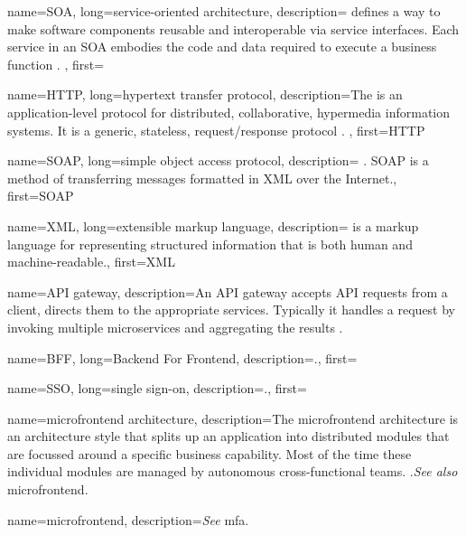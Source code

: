{
    name=SOA, 
    long={service-oriented architecture},
    description={
     defines a way to make software components reusable and
    interoperable via service interfaces. Each service in an SOA embodies the
    code and data required to execute a business function \autocite{IBM_2021}.
    },
    first=
}

{
    name=HTTP,
    long={hypertext transfer protocol},
    description={The  is an application-level
    protocol for distributed, collaborative, hypermedia information
    systems. It is a generic, stateless, request/response protocol
    \autocite{Fielding_etal_1999}.
    },
    first=HTTP %
}

{
    name=SOAP, 
    long={simple object access protocol},
    description={
    . SOAP is a method of transferring messages formatted in
    XML over the Internet.},
    first=SOAP
}

{
    name=XML,
    long={extensible markup language},
    description={ is a markup language for representing
    structured information that is both human and machine-readable.},
    first=XML
}


{  
    name=API gateway, 
    description={An API gateway accepts API requests from a
    client, directs them to the appropriate services. Typically it handles a
    request by invoking multiple microservices and aggregating the results
    \autocite{Nginx_2021}.}
}


{
    name=BFF,
    long={Backend For Frontend},
    description={.},
    first=
}

{
    name=SSO,
    long={single sign-on},
    description={.},
    first=
}

{
    name={microfrontend architecture}, 
    description={The microfrontend architecture
    is an architecture style that splits up an application into distributed
    modules that are focussed around a specific business capability. Most of the
    time these individual modules are managed by autonomous cross-functional
    teams. \autocite{Geers_2020}\autocite{Rappl_2021}.\textit{See also}
    \gls{microfrontend}.}   
}

{
    name=microfrontend, 
    description={\textit{See} \gls{mfa}.}   
}


